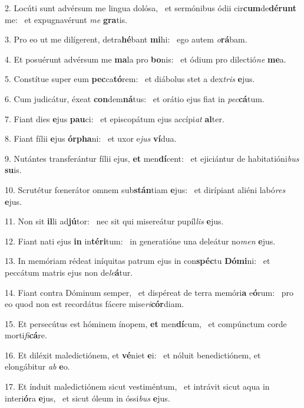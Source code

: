 2. Locúti sunt advérsum me lingua dolósa, \dag\  et sermónibus ódii cir\textbf{cum}de\textbf{dé}\textbf{runt} me: \ast\  et expugnavérunt \textit{me} \textbf{gra}tis.\

3. Pro eo ut me dilígerent, detra\textbf{hé}bant \textbf{mi}hi: \ast\  ego autem \textit{o}\textbf{rá}bam.\

4. Et posuérunt advérsum me \textbf{ma}la pro \textbf{bo}nis: \ast\  et ódium pro dilectió\textit{ne} \textbf{me}a.\

5. Constítue super eum \textbf{pec}ca\textbf{tó}rem: \ast\  et diábolus stet a dex\textit{tris} \textbf{e}jus.\

6. Cum judicátur, éxeat \textbf{con}dem\textbf{ná}tus: \ast\  et orátio ejus fiat in \textit{pec}\textbf{cá}tum.\

7. Fiant dies \textbf{e}jus \textbf{pau}ci: \ast\  et episcopátum ejus accípi\textit{at} \textbf{al}ter.\

8. Fiant fílii \textbf{e}jus \textbf{ór}\textbf{pha}ni: \ast\  et uxor e\textit{jus} \textbf{ví}dua.\

9. Nutántes transferántur fílii ejus, \textbf{et} men\textbf{dí}cent: \ast\  et ejiciántur de habitatióni\textit{bus} \textbf{su}is.\

10. Scrutétur fœnerátor omnem sub\textbf{stán}tiam \textbf{e}jus: \ast\  et dirípiant aliéni labó\textit{res} \textbf{e}jus.\

11. Non sit \textbf{il}li ad\textbf{jú}tor: \ast\  nec sit qui misereátur pupíl\textit{lis} \textbf{e}jus.\

12. Fiant nati ejus \textbf{in} in\textbf{tér}\textbf{i}tum: \ast\  in generatióne una deleátur no\textit{men} \textbf{e}jus.\

13. In memóriam rédeat iníquitas patrum ejus in con\textbf{spéc}tu \textbf{Dó}\textbf{mi}ni: \ast\  et peccátum matris ejus non de\textit{le}\textbf{á}tur.\

14. Fiant contra Dóminum semper, \dag\  et dispéreat de terra memóri\textbf{a} e\textbf{ó}rum: \ast\  pro eo quod non est recordátus fácere mise\textit{ri}\textbf{cór}diam.\

15. Et persecútus est hóminem ínopem, \textbf{et} men\textbf{dí}cum, \ast\  et compúnctum corde morti\textit{fi}\textbf{cá}re.\

16. Et diléxit maledictiónem, et \textbf{vé}niet \textbf{e}i: \ast\  et nóluit benedictiónem, et elongábitur \textit{ab} \textbf{e}o.\

17. Et índuit maledictiónem sicut vestiméntum, \dag\  et intrávit sicut aqua in interi\textbf{ó}ra \textbf{e}jus, \ast\  et sicut óleum in óssi\textit{bus} \textbf{e}jus.\

